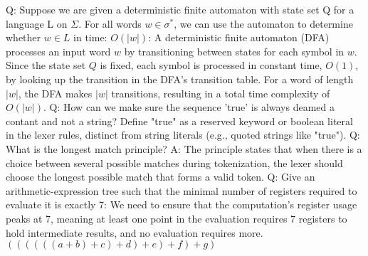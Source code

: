 Q: Suppose we are given a deterministic finite automaton with state set Q for a language L on $\Sigma$. For all words $w \in \sigma^*$, we can use the automaton to determine whether $w \in L$ in time: $O( \vert w \vert )$: A deterministic finite automaton (DFA) processes an input word $ w $ by transitioning between states for each symbol in $ w $. Since the state set $ Q $ is fixed, each symbol is processed in constant time, $ O(1) $, by looking up the transition in the DFA's transition table. For a word of length $  \vert w \vert  $, the DFA makes $  \vert w \vert  $ transitions, resulting in a total time complexity of $ O( \vert w \vert ) $.
Q: How can we make sure the sequence 'true' is always deamed a contant and not a string? Define "true" as a reserved keyword or boolean literal in the lexer rules, distinct from string literals (e.g., quoted strings like "true").
Q: What is the longest match principle?
A: The principle states that when there is a choice between several possible matches during tokenization, the lexer should choose the longest possible match that forms a valid token.
Q: Give an arithmetic-expression tree such that the minimal number of registers required to evaluate it is exactly 7: We need to ensure that the computation's register usage peaks at 7, meaning at least one point in the evaluation requires 7 registers to hold intermediate results, and no evaluation requires more. $((((((a + b) + c) + d) + e) + f) + g)$